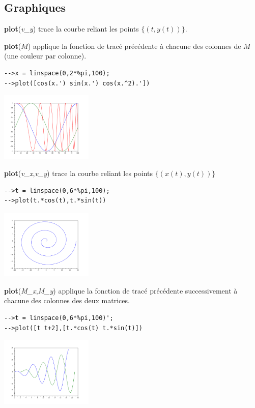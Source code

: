 \documentclass{article}
\begin{document}
\begin{multicols}{3}
\section{Graphiques}
\label{graphiques}
\begin{description}
\item{\textbf{plot}(\textit{v\_y})}  trace la courbe reliant les points $\{(t,y(t))\}$.
\item{\textbf{plot}($M$)}  applique la fonction de tracé précédente à chacune des colonnes de $M$ (une couleur par colonne).
\begin{verbatim}
-->x = linspace(0,2*%pi,100);
-->plot([cos(x.') sin(x.') cos(x.^2).'])
\end{verbatim}
\includegraphics[width=0.33\textwidth]{images/plotmat.pdf}
\item{\textbf{plot}(\textit{v\_x},\textit{v\_y})}  trace la courbe reliant les points $\{(x(t),y(t))\}$
\begin{verbatim}
-->t = linspace(0,6*%pi,100);
-->plot(t.*cos(t),t.*sin(t))
\end{verbatim}
\includegraphics[width=0.33\textwidth]{images/snail.pdf}
\item{\textbf{plot}(\textit{M\_x},\textit{M\_y})}  applique la fonction de tracé précédente successivement à chacune des colonnes des deux matrices.
\begin{verbatim}
-->t = linspace(0,6*%pi,100)';
-->plot([t t+2],[t.*cos(t) t.*sin(t)])
\end{verbatim}
\includegraphics[width=0.33\textwidth]{images/plotmat2.pdf}

\end{description}
\end{multicols}
\end{document}
